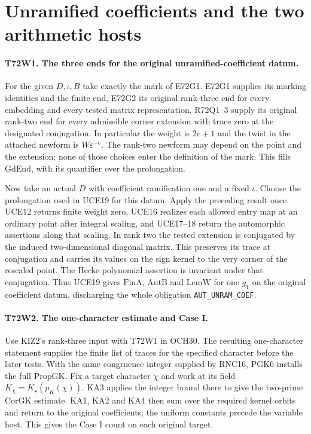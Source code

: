 \section{Unramified coefficients and the two arithmetic hosts}

\paragraph{T72W1. The three ends for the original unramified-coefficient datum.}
For the given $D,\iota,B$ take exactly the mark of E72G1.
E72G1 supplies its marking identities and the finite end,
E72G2 its original rank-three end for every embedding and every
tested matrix representation. R72Q1--3 supply its original rank-two
end for every admissible corner extension with trace zero at the
designated conjugation. In particular the weight is $2e+1$ and
the twist in the attached newform is $W\varepsilon^{-e}$. The
rank-two newform may depend on the point and the extension; none
of those choices enter the definition of the mark. This fills
$\mathrm{GdEnd}$, with its quantifier over the prolongation.

Now take an actual $D$ with coefficient ramification one and a
fixed $\iota$. Choose the prolongation used in UCE19 for this
datum. Apply the preceding result once. UCE12 returns finite
weight zero, UCE16 realizes each allowed entry map at an ordinary
point after integral scaling, and UCE17--18 return the automorphic
assertions along that scaling. In rank two the tested extension is
conjugated by the induced two-dimensional diagonal matrix. This
preserves its trace at conjugation and carries its values on the
sign kernel to the very corner of the rescaled point. The Hecke
polynomial assertion is invariant under that conjugation. Thus UCE19
gives $\mathrm{FinA}$, $\mathrm{AutB}$ and $\mathrm{LemW}$ for
one $g_1$ on the original coefficient datum, discharging the
whole obligation \texttt{AUT\_UNRAM\_COEF}.

\paragraph{T72W2. The one-character estimate and Case I.}
Use KIZ2's rank-three input with T72W1 in OCH30. The resulting
one-character statement supplies the finite list of traces for the
specified character before the later tests. With the same congruence
integer supplied by RNC16, PGK6 installs the full $\mathrm{PropGK}$.
Fix a target character $\chi$ and work at its field
$K_\chi=K_\star(p_K(\chi))$. KA3 applies the integer bound there
to give the two-prime $\mathrm{CorGK}$ estimate. KA1, KA2 and KA4
then sum over the required kernel orbits and return to the original
coefficients; the uniform constants precede the variable host.
This gives the Case I count on each original target.

